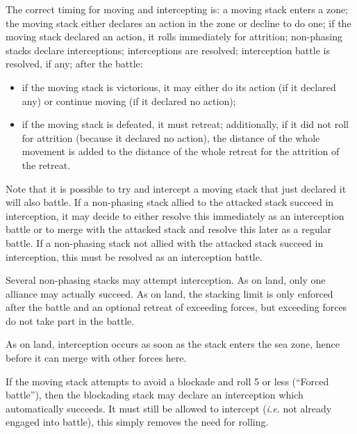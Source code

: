 \aparag The correct timing for moving and intercepting is:
\bparag a moving stack enters a zone;
\bparag the moving stack either declares an action in the zone or decline to
do one;
\bparag if the moving stack declared an action, it rolls immediately for
attrition;
\bparag non-phasing stacks declare interceptions;
\bparag interceptions are resolved;
\bparag interception battle is resolved, if any;
\bparag after the battle:
\begin{itemize}
\item if the moving stack is victorious, it may either do its action (if it
  declared any) or continue moving (if it declared no action);
\item if the moving stack is defeated, it must retreat; additionally, if it
  did not roll for attrition (because it declared no action), the distance of
  the whole movement is added to the distance of the whole retreat for the
  attrition of the retreat.
\end{itemize}

Note that it is possible to try and intercept a moving stack that just
declared it will also battle. If a non-phasing stack allied to the attacked
stack succeed in interception, it may decide to either resolve this
immediately as an interception battle or to merge with the attacked stack and
resolve this later as a regular battle. If a non-phasing stack not allied with
the attacked stack succeed in interception, this must be resolved as an
interception battle.

Several non-phasing stacks may attempt interception. As on land, only one
alliance may actually succeed. As on land, the stacking limit is only enforced
after the battle and an optional retreat of exceeding forces, but exceeding
forces do not take part in the battle.

As on land, interception occurs as soon as the stack enters the sea zone,
hence before it can merge with other forces here.

If the moving stack attempts to avoid a blockade and roll 5 or less (``Forced
battle''), then the blockading stack may declare an interception which
automatically succeeds. It must still be allowed to intercept (\emph{i.e.} not
already engaged into battle), this simply removes the need for rolling.

